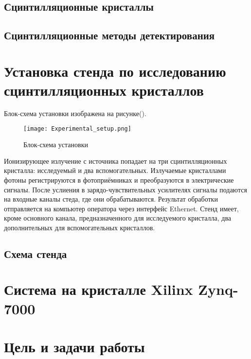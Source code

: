 \documentclass[a4paper, 14pt]{extarticle}
\begin{document}
    \subsection{Сцинтилляционные кристаллы}
    
    \subsection{Сцинтилляционные методы детектирования}
    

\section{Установка стенда по исследованию сцинтилляционных кристаллов}
    Блок-схема установки изображена на рисунке().\par
    \begin{figure}[ht]
        \centering
        \texttt{[image: Experimental\_setup.png]}
        \caption{Блок-схема установки}
        \label{fig:mpr}
    \end{figure}
    Ионизирующее излучение с источника попадает на три сцинтилляционных кристалла: исследуемый и два вспомогательных. Излучаемые кристаллами фотоны регистрируются в фотоприёмниках и преобразуются в электрические сигналы. После услиения в зарядо-чувствительных усилителях сигналы подаются на входные каналы стеда, где они обрабатываются. Результат обработки отправляется на компьютер оператора через интерфейс Ethernet. Стенд имеет, кроме основного канала, предназначенного для исследуемого кристалла, два дополнительных для вспомогательных кристаллов.
    
    \subsection{Схема стенда}
    

\section{Система на кристалле Xilinx Zynq-7000}
    
    
\section{Цель и задачи работы}
    
    
\end{document}
